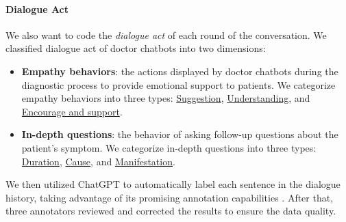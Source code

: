 \paragraph{Dialogue Act}
We also want to code the \textit{dialogue act} of each round of the conversation. We classified dialogue act of doctor chatbots into two dimensions: 
\begin{itemize}
    \item \textbf{Empathy behaviors}: the actions displayed by doctor chatbots during the diagnostic process to provide emotional support to patients. We categorize empathy behaviors into three types: \uline{Suggestion}, \uline{Understanding}, and \uline{Encourage and support}.
    \item \textbf{In-depth questions}: the behavior of asking follow-up questions about the patient's symptom. We categorize in-depth questions into three types: \uline{Duration}, \uline{Cause}, and \uline{Manifestation}.
\end{itemize}

We then utilized ChatGPT to automatically label each sentence in the dialogue history, taking advantage of its promising annotation capabilities \cite{Gilardi2023ChatGPTOC}. After that, three annotators reviewed and corrected the results to ensure the data quality.


